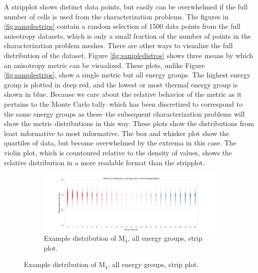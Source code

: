 A stripplot shows distinct data points, but easily can be overwhelmed if the
full number of cells is used from the characterization problems. The figures in
\ref{fig:samplestrips} contain a random selection of 1500 data points from the
full anisotropy datasets,
which is only a small fraction of the number of points in the characterization
problem meshes. There are other ways to visualize the full distribution of the
dataset. Figure \ref{fig:sampledistros} shows three means by which an anisotropy metric
can be visualized. These plots, unlike Figure \ref{fig:samplestrips}, show a
single metric but all energy groups. The highest energy group is plotted in deep
red, and the lowest or most thermal energy group is shown in blue.
Because we care about the relative behavior
of the metric as it pertains to the Monte Carlo tally--which has been
discretized to correspond to the same energy groups as these--the subsequent
characterization problems
will show the metric distributions in this way. These plots
show the distributions from least informative to most informative. The box and
whisker plot show the quartiles of data, but become overwhelmed by the extrema
in this case. The violin plot, which is countoured relative to the density of
values, shows the relative distribution in a more readable format than the
stripplot.
\begin{figure}[htb]
  \centering
  \begin{subfigure}[t]{\textwidth}
    \includegraphics[width=\linewidth]{./chapters/characterization_probs/figures/sample_data/metric_four_strip_full.pdf}
    \caption{Example distribution of M$_4$, all energy groups, strip plot.}
    \label{fig:samplestripM4}
  \end{subfigure}
\end{figure}

